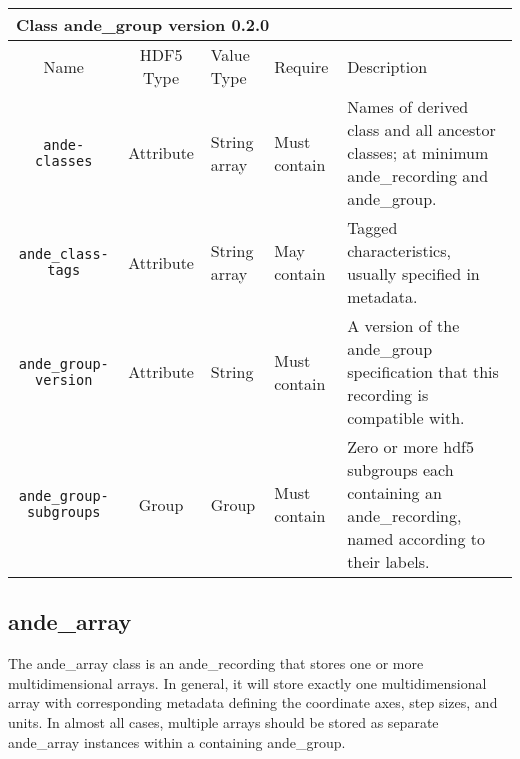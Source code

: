 \documentclass{article}
\newenvironment{AndeClass}[3]{
  
  \begin{tabular}{|c c p{.4in} p{.5in} p{2.9in}|}
    \multicolumn{5}{l}{{\Large \bf Class}{\Large \ttfamily \fontseries{b} #1} version #2 \ifthenelse{\equal{#3}{}}{}{; derives from #3}} \\
    \hline
    Name & HDF5 Type & Value Type & Require & Description \\
    \hline
}{
  \hline
  \end{tabular}
}
\newcommand{\AndeElementLine}[5]{{\tt #1} & #2 & #3 & #4 & #5 \\}
\newcommand{\AndeClassesLine}[1]{
  \AndeElementLine{ande-classes}{Attribute}{String array}{Must contain}{
    Names of derived class and all ancestor classes; at minimum #1.
  }
}
\newcommand{\AndeClassTagsLine}[1]{
  \AndeElementLine{ande\_class-tags}{Attribute}{String array}{May contain}{
    Tagged characteristics, usually specified in metadata\ifthenelse{\equal{#1}{}}{}{; at minimum #1}.
  }
}
\begin{document}
\newcommand{\AndeGroupElements}{
    \AndeElementLine{ande\_group-version}{Attribute}{String}{Must contain}{
      A version of the ande\_group specification that this recording is compatible with.
    }
    \AndeElementLine{ande\_group-subgroups}{Group}{Group}{Must contain}{
      Zero or more hdf5 subgroups each containing an ande\_recording, named according to their labels.
    }
  }

\begin{AndeClass}{ande\_group}{0.2.0}{ande\_recording}
  \AndeClassesLine{ande\_recording and ande\_group}
  \AndeClassTagsLine{}
  \AndeRecordingElements
  \AndeGroupElements %
\end{AndeClass}

\subsection{ande\_array}
The ande\_array class is an ande\_recording that stores one or more multidimensional arrays. In general, it will store exactly one multidimensional array with corresponding metadata defining the coordinate axes, step sizes, and units. In almost all cases, multiple arrays should be stored as separate ande\_array instances within a containing ande\_group.
\end{document}
